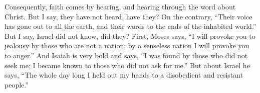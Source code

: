 \begin{biblechapter}
\verse Consequently, faith comes by hearing, and hearing through the word about Christ.
\verse But I say, they have not heard, have they? On the contrary, “Their voice has gone out to all the earth, 
and their words to the ends of the inhabited world.”
\verse But I say, Israel did not know, did they? First, Moses says, “I will provoke you to jealousy by those who are not a nation; 
by a senseless nation I will provoke you to anger.”
\verse And Isaiah is very bold and says, “I was found by those who did not seek me; 
I became known to those who did not ask for me.”
\verse But about Israel he says, “The whole day long I held out my hands 
to a disobedient and resistant people.”
\end{biblechapter}

